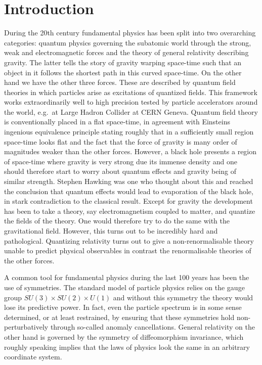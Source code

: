\chapter{Introduction}
During the 20th century fundamental physics has been split into two overarching categories: quantum physics governing the subatomic world through the strong, weak and electromagnetic forces and the theory of general relativity describing gravity. The latter tells the story of gravity warping space-time such that an object in it follows the shortest path in this curved space-time. On the other hand we have the other three forces. These are described by quantum field theories in which particles arise as excitations of quantized fields. This framework works extraordinarily well to high precision tested by particle accelerators around the world, e.g.\ at Large Hadron Collider at CERN Geneva. Quantum field theory is conventionally placed in a flat space-time, in agreement with Einsteins ingenious equivalence principle stating roughly that in a sufficiently small region space-time looks flat and the fact that the force of gravity is many order of magnitudes weaker than the other forces. However, a black hole presents a region of space-time where gravity is very strong due its immense density and one should therefore start to worry about quantum effects and gravity being of similar strength. Stephen Hawking was one who thought about this and reached the conclusion that quantum effects would lead to evaporation of the black hole, in stark contradiction to the classical result. Except for gravity the development has been to take a theory, say electromagnetism coupled to matter, and quantize the fields of the theory. One would therefore try to do the same with the gravitational field. However, this turns out to be incredibly hard and pathological. Quantizing relativity turns out to give a non-renormalisable theory unable to predict physical observables in contrast the renormalisable theories of the other forces. 

A common tool for fundamental physics during the last 100 years has been the use of symmetries. The standard model of particle physics relies on the gauge group $SU(3)\times SU(2)\times U(1)$ and without this symmetry the theory would lose its predictive power. In fact, even the particle spectrum is in some sense determined, or at least restrained, by ensuring that these symmetries hold non-perturbatively through so-called anomaly cancellations. General relativity on the other hand is governed by the symmetry of diffeomorphism invariance, which roughly speaking implies that the laws of physics look the same in an arbitrary coordinate system. 


